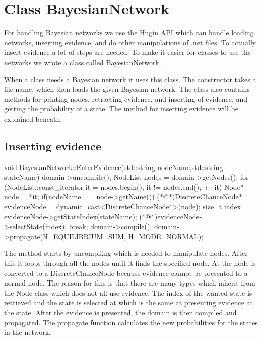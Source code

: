 \section{Class BayesianNetwork}
	For handling Bayesian networks we use the Hugin API which can handle loading networks, inserting evidence, and do other manipulations of .net files. To actually 
	insert evidence a lot of steps are needed. To make it easier for classes to use the networks we wrote a class called BayesianNetwork.

	When a class needs a Bayesian network it uses this class. The constructor takes a file name, which then loads the given 
	Bayesian network. The class also contains methods for printing nodes, retracting evidence, and inserting of evidence, and getting the probability of a state. 
	The method for inserting evidence will be explained beneath.
	\subsection*{Inserting evidence}
		\begin{Sourcecode}[caption=EnterEvidence method]
void BayesianNetwork::EnterEvidence(std::string nodeName,std::string stateName)
{
domain->uncompile();
NodeList nodes = domain->getNodes();
for (NodeList::const_iterator it = nodes.begin(); it != nodes.end(); ++it)
{
	Node* node = *it;
	if(nodeName == node->getName())
	{
		(*@\lnote@*)DiscreteChanceNode* evidenceNode = dynamic_cast<DiscreteChanceNode*>(node);
		size_t index = evidenceNode->getStateIndex(stateName);
		(*@\lnote@*)evidenceNode->selectState(index);
		break;
	}
}
domain->compile();
domain->propagate(H_EQUILIBRIUM_SUM, H_MODE_NORMAL);
}
		\end{Sourcecode}
		The method starts by uncompiling which is needed to manipulate nodes. After this it loops through all the nodes until it finds the specified 
		node. At  the node is converted to a DiscreteChanceNode because evidence cannot be presented to a normal node. The reason for this 
		is that there are many types which inherit from the Node class which does not all use evidence. The index of the wanted state is	retrieved and the state is selected at  which is the same at presenting evidence at the state. After the evidence is presented, the 
		domain is then compiled and propagated. The propagate function calculates the new probabilities for the states in the network.